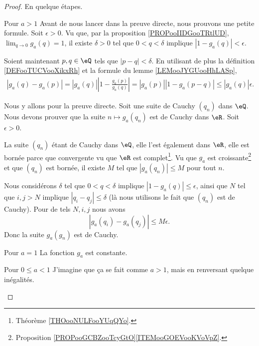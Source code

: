 \begin{proof}
    En quelque étapes.
    \begin{subproof}
        \item[Pour \( a>1\)]
            Avant de nous lancer dans la preuve directe, nous prouvons une petite formule. Soit \( \epsilon>0\). Vu que, par la proposition \ref{PROPooIIDGooTRtlUD}, \( \lim_{q\to 0} g_a(q)=1\), il existe \( \delta>0\) tel que \( 0<q<\delta\) implique \( | 1-g_a(q) |<\epsilon\).

            Soient maintenant \( p,q\in \eQ\) tels que \( | p-q |<\delta\). En utilisant de plus la définition \eqref{DEFooTUCVooXikxRh} et la formule du lemme \ref{LEMooJYGUooHhLASp},
            \begin{subequations}
                \begin{align}
                    | g_a(q)-g_a(p) |=| g_a(q) |\left| 1-\frac{ g_a(p) }{ g_a(q) } \right| =| g_a(p) | | 1-g_a(p-q) |\leq | g_a(q) |\epsilon.
                \end{align}
            \end{subequations}
            
            Nous y allons pour la preuve directe. Soit une suite de Cauchy \( (q_n)\) dans \( \eQ\). Nous devons prouver que la suite \( n\mapsto g_a(q_n)\) est de Cauchy dans \( \eR\). Soit \( \epsilon>0\).

            La suite \((q_n)\) étant de Cauchy dans \( \eQ\), elle l'est également dans \( \eR\), elle est bornée parce que convergente vu que \( \eR\) est complet\footnote{Théorème \ref{THOooNULFooYUqQYo}.}. Vu que \( g_a\) est croissante\footnote{Proposition \ref{PROPooGCBZooTcyGtO}\ref{ITEMooGOEVooKVoVpZ}.} et que \( (q_n)\) est bornée, il existe \( M\) tel que \( | g_a(q_n) |\leq M\) pour tout \( n\).

            Nous considérons \( \delta\) tel que \( 0<q<\delta\) implique \( | 1-g_a(q) |\leq \epsilon\), ainsi que \( N\) tel que \( i,j>N\) implique \( | q_i-q_j |\leq \delta\) (là nous utilisons le fait que \( (q_n)\) est de Cauchy). Pour de tels \( N, i,j\) nous avons
            \begin{equation}
                | g_a(q_i)-g_a(q_j) |\leq M\epsilon.
            \end{equation}
            Donc la suite \( g_a(g_n)\) est de Cauchy.

        \item[Pour \( a=1\)]
            La fonction \( g_a\) est constante.
        \item[Pour \( 0\leq a<1\)]
            J'imagine que ça se fait comme \( a>1\), mais en renversant quelque inégalités.
    \end{subproof}
\end{proof}

